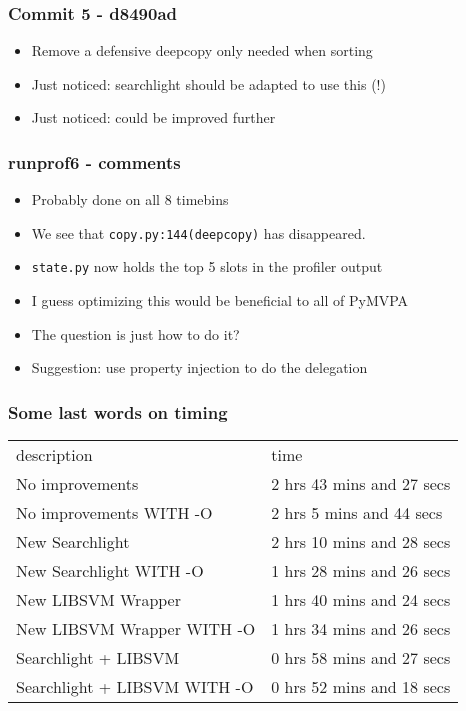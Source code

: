 \begin{frame}
 \frametitle{Commit 5 - d8490ad}
  


\begin{itemize}
  \item Remove a defensive deepcopy only needed when sorting
  \item Just noticed: searchlight should be adapted to use this (!)
  \item Just noticed: could be improved further
\end{itemize}

  
 \end{frame}
\begin{frame}
 \frametitle{runprof6 - comments}
  


\begin{itemize}
  \item Probably done on all 8 timebins
  \item We see that \texttt{copy.py:144(deepcopy)} has disappeared.
  \item \texttt{state.py} now holds the top 5 slots in the profiler output
  \item I guess optimizing this would be beneficial to all of PyMVPA
  \item The question is just how to do it?
  \item Suggestion: use property injection to do the delegation
\end{itemize}

  
 \end{frame}
\begin{frame}
 \frametitle{Some last words on timing}
  


\begin{tabular}{ l l  }
description                    &  time                              \\
No improvements                &  2 hrs 43 mins and 27 secs \\
No improvements WITH -O        &  2 hrs 5  mins and 44 secs \\
New Searchlight                &  2 hrs 10 mins and 28 secs \\
New Searchlight WITH -O        &  1 hrs 28 mins and 26 secs \\
New LIBSVM Wrapper             &  1 hrs 40 mins and 24 secs \\
New LIBSVM Wrapper WITH -O     &  1 hrs 34 mins and 26 secs \\
Searchlight + LIBSVM           &  0 hrs 58 mins and 27 secs \\
Searchlight + LIBSVM WITH -O   &  0 hrs 52 mins and 18 secs \\
\end{tabular}

  
 \end{frame}
